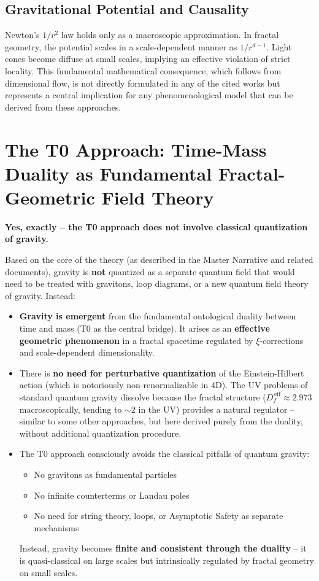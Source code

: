 	\subsection{Gravitational Potential and Causality}
	Newton's $1/r^2$ law holds only as a macroscopic approximation. In fractal geometry, the potential scales in a scale-dependent manner as $1/r^{d-1}$. Light cones become diffuse at small scales, implying an effective violation of strict locality. This fundamental mathematical consequence, which follows from dimensional flow, is not directly formulated in any of the cited works but represents a central implication for any phenomenological model that can be derived from these approaches.
	
	\section{The T0 Approach: Time-Mass Duality as Fundamental Fractal-Geometric Field Theory}
	
	\textbf{Yes, exactly – the T0 approach does not involve classical quantization of gravity.}
	
	Based on the core of the theory (as described in the Master Narrative and related documents), gravity is \textbf{not} quantized as a separate quantum field that would need to be treated with gravitons, loop diagrams, or a new quantum field theory of gravity. Instead:
	
	\begin{itemize}
		\item \textbf{Gravity is emergent} from the fundamental ontological duality between time and mass (T0 as the central bridge). It arises as an \textbf{effective geometric phenomenon} in a fractal spacetime regulated by $\xi$-corrections and scale-dependent dimensionality.
		
		\item There is \textbf{no need for perturbative quantization} of the Einstein-Hilbert action (which is notoriously non-renormalizable in 4D). The UV problems of standard quantum gravity dissolve because the fractal structure ($D_f^{\,\text{eff}} \approx 2.973$ macroscopically, tending to $\sim 2$ in the UV) provides a natural regulator – similar to some other approaches, but here derived purely from the duality, without additional quantization procedure.
		
		\item The T0 approach consciously avoids the classical pitfalls of quantum gravity:
		\begin{itemize}
			\item No gravitons as fundamental particles
			\item No infinite counterterms or Landau poles
			\item No need for string theory, loops, or Asymptotic Safety as separate mechanisms
		\end{itemize}
		Instead, gravity becomes \textbf{finite and consistent through the duality} – it is quasi-classical on large scales but intrinsically regulated by fractal geometry on small scales.
	\end{itemize}
	
